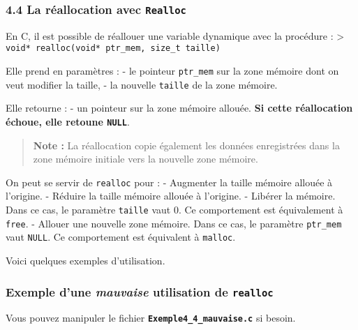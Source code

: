 \documentclass[11pt]{article}
\begin{document}
    \subsubsection{\texorpdfstring{4.4 La réallocation avec
\texttt{Realloc}}{4.4 La réallocation avec Realloc}}\label{la-ruxe9allocation-avec-realloc}

En C, il est possible de réallouer une variable dynamique avec la
procédure : \textgreater{}
\texttt{void*\ realloc(void*\ ptr\_mem,\ size\_t\ taille)}

Elle prend en paramètres : - le pointeur \texttt{ptr\_mem} sur la zone
mémoire dont on veut modifier la taille, - la nouvelle \texttt{taille}
de la zone mémoire.

Elle retourne : - un pointeur sur la zone mémoire allouée. \textbf{Si
cette réallocation échoue, elle retoune \texttt{NULL}}.

\begin{quote}
\textbf{Note :} La réallocation copie également les données enregistrées
dans la zone mémoire initiale vers la nouvelle zone mémoire.
\end{quote}

On peut se servir de \texttt{realloc} pour : - Augmenter la taille
mémoire allouée à l'origine. - Réduire la taille mémoire allouée à
l'origine. - Libérer la mémoire. Dans ce cas, le paramètre
\texttt{taille} vaut 0. Ce comportement est équivalement à
\texttt{free}. - Allouer une nouvelle zone mémoire. Dans ce cas, le
paramètre \texttt{ptr\_mem} vaut \texttt{NULL}. Ce comportement est
équivalent à \texttt{malloc}.

Voici quelques exemples d'utilisation.

    \subsubsection{\texorpdfstring{Exemple d'une \emph{mauvaise} utilisation
de
\texttt{realloc}}{Exemple d'une mauvaise utilisation de realloc}}\label{exemple-dune-mauvaise-utilisation-de-realloc}

Vous pouvez manipuler le fichier
\textbf{\texttt{Exemple4\_4\_mauvaise.c}} si besoin.
\end{document}
